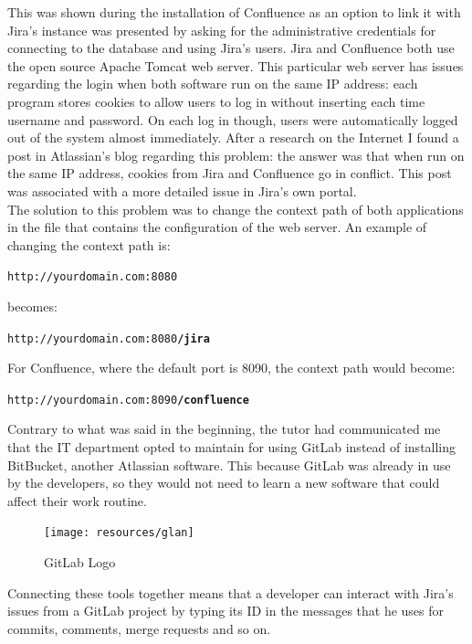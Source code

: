 	This was shown during the installation of Confluence as an option to link it with Jira's instance was presented by asking for the administrative credentials for connecting to the database and using Jira's users.
	Jira and Confluence both use the open source Apache Tomcat web server.
	This particular web server has issues regarding the login when both software run on the same IP address: each program stores \gls{cookies} to allow users to log in without inserting each time username and password.
	On each log in though, users were automatically logged out of the system almost immediately.
	After a research on the Internet I found a post\cite{user-is-constantly-logged-out-of-jira} in Atlassian's blog regarding this problem: the answer was that when run on the same IP address, cookies from Jira and Confluence go in conflict.
	This post was associated with a more detailed issue\cite{JRASERVER-36960} in Jira's own portal.\\
	The solution to this problem was to change the \gls{context path} of both applications\cite{how-to-change-the-jira-application-context-path} in the  file that contains the configuration of the web server.
	An example of changing the context path is:
	\begin{center}
		\texttt{http://yourdomain.com:8080}
	\end{center}
	\vspace{-10pt}
	becomes:
	\vspace{-10pt}
	\begin{center}
		\texttt{http://yourdomain.com:8080\textbf{/jira}}
	\end{center}
	For Confluence, where the default port is 8090, the context path would become:
	\begin{center}
		\texttt{http://yourdomain.com:8090\textbf{/confluence}}
	\end{center}
	Contrary to what was said in the beginning, the tutor had communicated me that the IT department opted to maintain for using GitLab\cite{gitlab} instead of installing BitBucket\cite{bitbucket}, another Atlassian software.	
	This because GitLab was already in use by the developers, so they would not need to learn a new software that could affect their work routine.
	\begin{figure}[H]
		\centering
		\texttt{[image: resources/glan]}\\
		\caption{GitLab Logo}
	\end{figure}
	Connecting these tools together means that a developer can interact with Jira's issues from a GitLab project by typing its ID in the messages that he uses for commits, comments, merge requests and so on.
